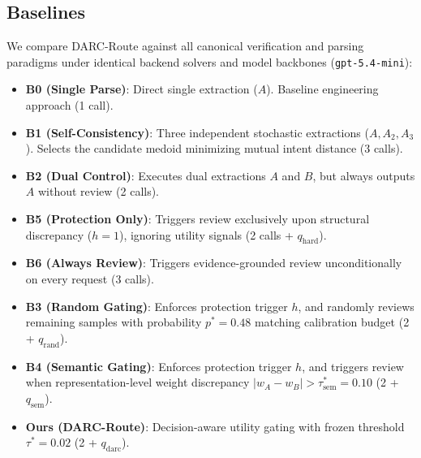 \documentclass[conference]{IEEEtran}
\begin{document}
\subsection{Baselines}
We compare DARC-Route against all canonical verification and parsing paradigms under identical backend solvers and model backbones (\texttt{gpt-5.4-mini}):
\begin{itemize}
    \item \textbf{B0 (Single Parse)}: Direct single extraction ($A$). Baseline engineering approach (1 call).
    \item \textbf{B1 (Self-Consistency)}: Three independent stochastic extractions ($A, A_2, A_3$). Selects the candidate medoid minimizing mutual intent distance (3 calls).
    \item \textbf{B2 (Dual Control)}: Executes dual extractions $A$ and $B$, but always outputs $A$ without review (2 calls).
    \item \textbf{B5 (Protection Only)}: Triggers review exclusively upon structural discrepancy ($h=1$), ignoring utility signals (2 calls + $q_{\text{hard}}$).
    \item \textbf{B6 (Always Review)}: Triggers evidence-grounded review unconditionally on every request (3 calls).
    \item \textbf{B3 (Random Gating)}: Enforces protection trigger $h$, and randomly reviews remaining samples with probability $p^* = 0.48$ matching calibration budget (2 + $q_{\text{rand}}$).
    \item \textbf{B4 (Semantic Gating)}: Enforces protection trigger $h$, and triggers review when representation-level weight discrepancy $|w_A - w_B| > \tau_{\text{sem}}^* = 0.10$ (2 + $q_{\text{sem}}$).
    \item \textbf{Ours (DARC-Route)}: Decision-aware utility gating with frozen threshold $\tau^* = 0.02$ (2 + $q_{\text{darc}}$).
\end{itemize}
\end{document}
